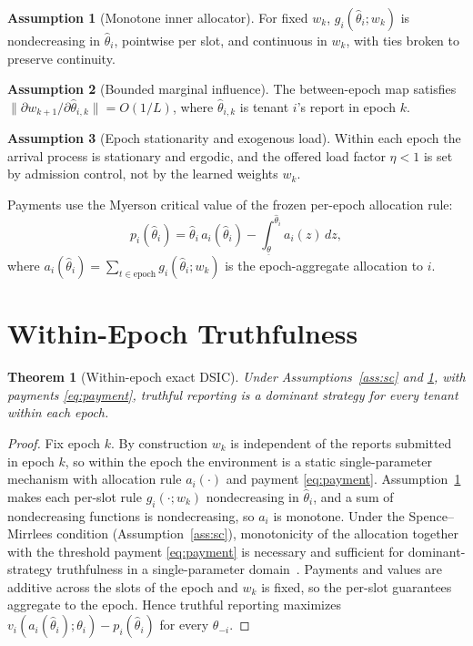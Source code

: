 \documentclass[conference]{IEEEtran}
\newtheorem{theorem}{Theorem}
\theoremstyle{definition}
\newtheorem{assumption}{Assumption}
\theoremstyle{remark}
\newcommand{\Ep}{L}
\newcommand{\load}{\eta}
\newcommand{\type}{\theta}
\newcommand{\wt}{w}
\newcommand{\val}{v}
\begin{document}
\begin{assumption}[Monotone inner allocator]\label{ass:mono}
For fixed $\wt_k$, $g_i(\hat\type_i;\wt_k)$ is nondecreasing in $\hat\type_i$, pointwise per slot, and continuous in $\wt_k$, with ties broken to preserve continuity.
\end{assumption}

\begin{assumption}[Bounded marginal influence]\label{ass:infl}
The between-epoch map satisfies $\lVert\partial\wt_{k+1}/\partial\hat\type_{i,k}\rVert=O(1/\Ep)$, where $\hat\type_{i,k}$ is tenant $i$'s report in epoch $k$.
\end{assumption}

\begin{assumption}[Epoch stationarity and exogenous load]\label{ass:stat}
Within each epoch the arrival process is stationary and ergodic, and the offered load factor $\load<1$ is set by admission control, not by the learned weights $\wt_k$.
\end{assumption}

Payments use the Myerson critical value of the frozen per-epoch allocation rule:
\begin{equation}\label{eq:payment}
p_i(\hat\type_i)=\hat\type_i\,a_i(\hat\type_i)-\int_{\underline{\type}}^{\hat\type_i} a_i(z)\,dz,
\end{equation}
where $a_i(\hat\type_i)=\sum_{t\in\text{epoch}}g_i(\hat\type_i;\wt_k)$ is the epoch-aggregate allocation to $i$.

\section{Within-Epoch Truthfulness}\label{sec:dsic}

\begin{theorem}[Within-epoch exact DSIC]\label{thm:dsic}
Under Assumptions~\ref{ass:sc} and \ref{ass:mono}, with payments \eqref{eq:payment}, truthful reporting is a dominant strategy for every tenant within each epoch.
\end{theorem}

\begin{proof}
Fix epoch $k$. By construction $\wt_k$ is independent of the reports submitted in epoch $k$, so within the epoch the environment is a static single-parameter mechanism with allocation rule $a_i(\cdot)$ and payment \eqref{eq:payment}. Assumption~\ref{ass:mono} makes each per-slot rule $g_i(\cdot;\wt_k)$ nondecreasing in $\hat\type_i$, and a sum of nondecreasing functions is nondecreasing, so $a_i$ is monotone. Under the Spence--Mirrlees condition (Assumption~\ref{ass:sc}), monotonicity of the allocation together with the threshold payment \eqref{eq:payment} is necessary and sufficient for dominant-strategy truthfulness in a single-parameter domain~\cite{ref:myerson}. Payments and values are additive across the slots of the epoch and $\wt_k$ is fixed, so the per-slot guarantees aggregate to the epoch. Hence truthful reporting maximizes $\val_i(a_i(\hat\type_i);\type_i)-p_i(\hat\type_i)$ for every $\type_{-i}$.
\end{proof}
\end{document}
